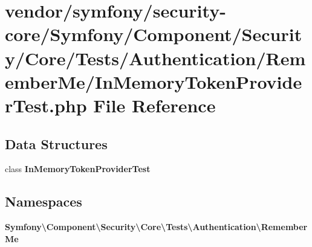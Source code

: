 \section{vendor/symfony/security-\/core/\+Symfony/\+Component/\+Security/\+Core/\+Tests/\+Authentication/\+Remember\+Me/\+In\+Memory\+Token\+Provider\+Test.php File Reference}
\label{_in_memory_token_provider_test_8php}
\subsection*{Data Structures}
\begin{DoxyCompactItemize}
\item 
class {\bf In\+Memory\+Token\+Provider\+Test}
\end{DoxyCompactItemize}
\subsection*{Namespaces}
\begin{DoxyCompactItemize}
\item 
 {\bf Symfony\textbackslash{}\+Component\textbackslash{}\+Security\textbackslash{}\+Core\textbackslash{}\+Tests\textbackslash{}\+Authentication\textbackslash{}\+Remember\+Me}
\end{DoxyCompactItemize}
